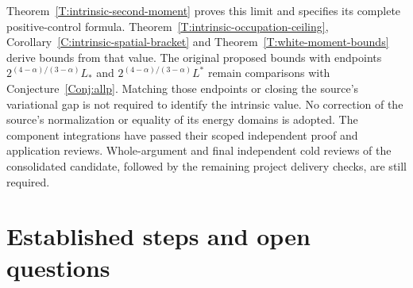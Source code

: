 \documentclass[12pt]{article}
\numberwithin{equation}{section}
\theoremstyle{definition}
\begin{document}
Theorem~\ref{T:intrinsic-second-moment} proves this limit and specifies
its complete positive-control formula.
Theorem~\ref{T:intrinsic-occupation-ceiling},
Corollary~\ref{C:intrinsic-spatial-bracket} and
Theorem~\ref{T:white-moment-bounds} derive bounds from that value.
The original proposed bounds with endpoints
$2^{(4-\alpha)/(3-\alpha)}L_*$ and
$2^{(4-\alpha)/(3-\alpha)}L^*$ remain comparisons with
Conjecture~\ref{Conj:allp}. Matching those endpoints or closing the source's
variational gap is not required to identify the intrinsic value.
No correction of the source's normalization or equality of its energy
domains is adopted. The component integrations have passed their scoped
independent proof and application reviews. Whole-argument and final
independent cold reviews of the consolidated candidate, followed by
the remaining project delivery checks, are still required.

\section{Established steps and open questions}\label{S:route}
\end{document}
